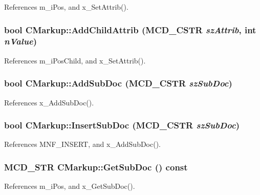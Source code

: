 References m\_\-iPos, and x\_\-SetAttrib().
\subsubsection[AddChildAttrib]{\setlength{\rightskip}{0pt plus 5cm}bool CMarkup::AddChildAttrib ({\bf MCD\_\-CSTR} {\em szAttrib}, \/  int {\em nValue})\hspace{0.3cm}{\tt  [inline]}}\label{classCMarkup_6038dab1d6fe99029937e6701c3d33d8}




References m\_\-iPosChild, and x\_\-SetAttrib().
\subsubsection[AddSubDoc]{\setlength{\rightskip}{0pt plus 5cm}bool CMarkup::AddSubDoc ({\bf MCD\_\-CSTR} {\em szSubDoc})\hspace{0.3cm}{\tt  [inline]}}\label{classCMarkup_cc3a92d27a83cd20854244027b0269b7}




References x\_\-AddSubDoc().
\subsubsection[InsertSubDoc]{\setlength{\rightskip}{0pt plus 5cm}bool CMarkup::InsertSubDoc ({\bf MCD\_\-CSTR} {\em szSubDoc})\hspace{0.3cm}{\tt  [inline]}}\label{classCMarkup_8f2a8484e2d4f8a27032f14818d96a66}




References MNF\_\-INSERT, and x\_\-AddSubDoc().
\subsubsection[GetSubDoc]{\setlength{\rightskip}{0pt plus 5cm}MCD\_\-STR CMarkup::GetSubDoc () const\hspace{0.3cm}{\tt  [inline]}}\label{classCMarkup_9d963c7234a4cecc16d9bd46c32ff87a}




References m\_\-iPos, and x\_\-GetSubDoc().
